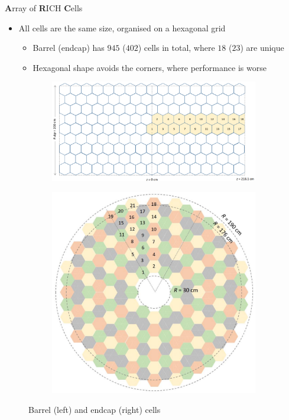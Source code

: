 \documentclass{beamer}
\begin{document}
\begin{frame}{\textbf{A}rray of \textbf{R}ICH \textbf{C}ells}
  \begin{itemize}
    \setlength\itemsep{1.0em}
    \item{All cells are the same size, organised on a hexagonal grid}
    \begin{itemize}
      \setlength\itemsep{0.5em}
      \item{Barrel (endcap) has $945$ ($402$) cells in total, where $18$ ($23$) are unique}
      \item{Hexagonal shape avoids the corners, where performance is worse}
    \end{itemize}
  \end{itemize}
  \vspace{0.3cm}
  \begin{figure}
    \centering
    \begin{subfigure}{0.6\textwidth}
      \includegraphics[width = 1.0\textwidth]{Plots/BarrelCells.png}
    \end{subfigure}%
    \begin{subfigure}{0.3\textwidth}
      \includegraphics[width = 1.0\textwidth]{Plots/EndcapCells.png}
    \end{subfigure}
    \caption{Barrel (left) and endcap (right) cells}
  \end{figure}
\end{frame}
\end{document}
